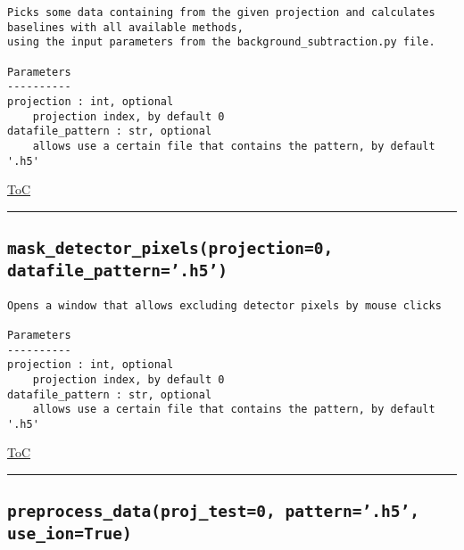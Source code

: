 \documentclass{article}
\begin{document}
\begin{lstlisting}[language=docstring]
Picks some data containing from the given projection and calculates baselines with all available methods,
using the input parameters from the background_subtraction.py file.
    
Parameters
----------
projection : int, optional
    projection index, by default 0
datafile_pattern : str, optional
    allows use a certain file that contains the pattern, by default '.h5'
\end{lstlisting}

\begin{flushright}

\hyperref[toc]{ToC}

\end{flushright}



\vspace{5mm}

\hrule

\subsection*{\texttt{mask\_detector\_pixels(projection=0, datafile\_pattern='.h5')}}
\label{fun:maskdetectorpixels}

\begin{lstlisting}[language=docstring]
Opens a window that allows excluding detector pixels by mouse clicks

Parameters
----------
projection : int, optional
    projection index, by default 0
datafile_pattern : str, optional
    allows use a certain file that contains the pattern, by default '.h5'
\end{lstlisting}

\begin{flushright}

\hyperref[toc]{ToC}

\end{flushright}



\vspace{5mm}

\hrule

\subsection*{\texttt{preprocess\_data(proj\_test=0, pattern='.h5', use\_ion=True)}}
\label{fun:preprocessdata}
\end{document}
